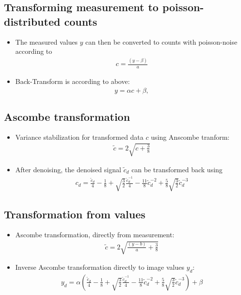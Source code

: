 \documentclass[]{article}
\begin{document}
\subsection{Transforming measurement to poisson-distributed counts}
\begin{itemize}
	\item The measured values $y$ can then be converted to counts with poisson-noise according to
	\begin{align}
		c = \frac{(y - \beta)}{a}
	\end{align}
	\item Back-Transform is according to above:
	\begin{align}
		y = \alpha c + \beta,
	\end{align}
\end{itemize}
\subsection{Ascombe transformation}
\begin{itemize}
	\item Variance stabilization for transformed data $c$ using Anscombe tranform:
	\begin{align}
		\tilde{c} = 2 \sqrt{c + \frac{3}{8}}
	\end{align}
	\item After denoising, the denoised signal $\tilde{c}_d$ can be transformed back using
	\begin{align}
		c_d = \frac{\tilde{c}_d}{4} - \frac{1}{8} + \sqrt{\frac{3}{2}} \frac{\tilde{c}_d^{-1}}{4} - \frac{11}{8} \tilde{c}_d^{-2} + \frac{5}{8}\sqrt{\frac{3}{2}} \tilde{c}_d^{-3}
	\end{align}
\end{itemize}
\subsection{Transformation from values}
\begin{itemize}
	\item Ascombe transformation, directly from measurement:
	\begin{align}
		\tilde{c} = 2 \sqrt{\frac{(y - b)}{a} + \frac{3}{8}}
		\label{eq:Trafo}
	\end{align}
	\item Inverse Ascombe transformation directly to image values $y_d$:
	\begin{align}
		y_d = 
		\alpha
		\left(\frac{\tilde{c}_d}{4} - \frac{1}{8} + \sqrt{\frac{3}{2}} \frac{\tilde{c}_d^{-1}}{4} - \frac{11}{8} \tilde{c}_d^{-2} + \frac{5}{8}\sqrt{\frac{3}{2}} \tilde{c}_d^{-3}\right)
		+ \beta
	\end{align}
\end{itemize}
\end{document}
